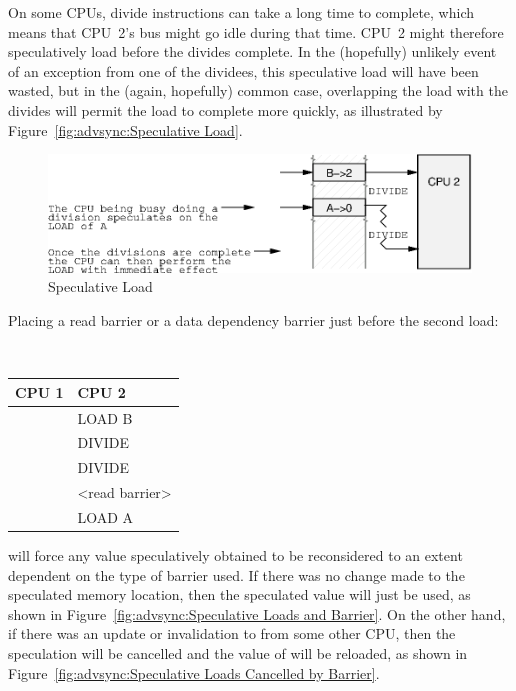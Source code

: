 On some CPUs, divide instructions can take a long time to complete,
which means that CPU~2's bus might go idle during that time.
CPU~2 might therefore speculatively load  before the divides
complete.
In the (hopefully) unlikely event of an exception from one of the dividees,
this speculative load will have been wasted, but in the (again, hopefully)
common case, overlapping the load with the divides will permit the load
to complete more quickly, as illustrated by
Figure~\ref{fig:advsync:Speculative Load}.

\begin{figure}[htb]
\centering
\includegraphics{advsync/SpeculativeLoad}
\caption{Speculative Load}
\end{figure}

Placing a read barrier or a data dependency barrier just before the second
load:

\vspace{5pt}
\begin{minipage}[t]{\columnwidth}
\tt
\scriptsize
\begin{tabular}{l|p{1.5in}}
	CPU 1 &		CPU 2 \\
	\hline
		&	LOAD B \\
		&	DIVIDE \\
		&	DIVIDE \\
		&	<read barrier> \\
		&	LOAD A \\
\end{tabular}
\end{minipage}
\vspace{5pt}

will force any value speculatively obtained to be reconsidered to an extent
dependent on the type of barrier used.  If there was no change made to the
speculated memory location, then the speculated value will just be used,
as shown in
Figure~\ref{fig:advsync:Speculative Loads and Barrier}.
On the other hand, if there was an update or invalidation to 
from some other CPU, then the speculation will be cancelled and the
value of  will be reloaded,
as shown in Figure~\ref{fig:advsync:Speculative Loads Cancelled by Barrier}.

